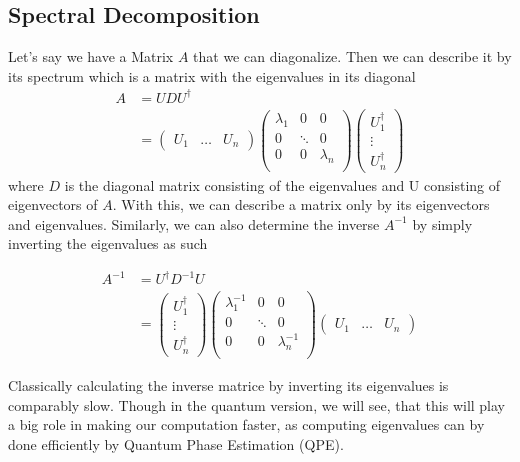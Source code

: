 \subsection{Spectral Decomposition}
Let's say we have a Matrix $A$ that we can diagonalize. 
Then we can describe it by its spectrum which is a matrix with the eigenvalues in its diagonal
\begin{equation} 
\begin{split}
A &=  U D U^{\dagger} \\
&= \begin{pmatrix} U_1 & \dots & U_n \end{pmatrix} \begin{pmatrix} \lambda_1 & 0 & 0 \\  0 & \ddots & 0\\ 0 & 0& \lambda_n \\ \end{pmatrix} \begin{pmatrix} U^\dagger_1 \\ \vdots \\ U^\dagger_n \end{pmatrix}
\end{split}
\end{equation}
where $D$ is the diagonal matrix consisting of the eigenvalues and U consisting of eigenvectors of $A$.
With this, we can describe a matrix only by its eigenvectors and eigenvalues. 
Similarly, we can also determine the inverse $A^{-1}$ by simply inverting the eigenvalues as such

\begin{equation}
\begin{split}
 A^{-1} 
 &=  U^{\dagger} D^{-1} U\\
 &= \begin{pmatrix} U^\dagger_1 \\ \vdots \\ U^\dagger_n \end{pmatrix}
\begin{pmatrix} \lambda_1^{-1} & 0 & 0\\ 0 & \ddots & 0\\ 0 & 0& \lambda_n^{-1} \\ \end{pmatrix}
\begin{pmatrix} U_1 & \dots & U_n \end{pmatrix} 
\end{split}
\end{equation}


Classically calculating the inverse matrice by inverting its eigenvalues is comparably slow. 
Though in the quantum version, we will see, that this will play a big role in making our computation faster, as computing eigenvalues can by done efficiently by Quantum Phase Estimation (QPE).

